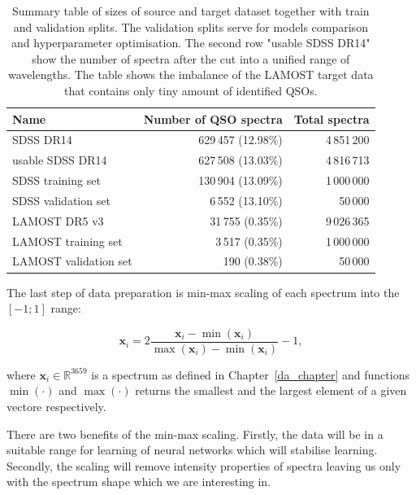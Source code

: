 \begin{table}
\begin{center}
\begin{tabular}{|l|r|r|}
	\hline
	Name & Number of QSO spectra & Total spectra \\ \hline \hline
	SDSS DR14 & 629\,457 (12.98\%) & 4\,851\,200 \\ \hline
	usable SDSS DR14 & 627\,508 (13.03\%) & 4\,816\,713 \\ \hline
	SDSS training set & 130\,904 (13.09\%) & 1\,000\,000 \\ \hline
	SDSS validation set & 6\,552 (13.10\%) & 50\,000 \\ \hline
	LAMOST DR5 v3 & 31\,755 (0.35\%) & 9\,026\,365 \\ \hline
	LAMOST training set & 3\,517 (0.35\%) & 1\,000\,000 \\ \hline
	LAMOST validation set & 190 (0.38\%) & 50\,000 \\ \hline
\end{tabular}
\end{center}
\caption[Sizes of source and target datasets]{
	Summary table of sizes of source and target dataset
	together with train and validation splits.
	The validation splits serve for models comparison
	and hyperparameter optimisation.
	The second row "usable SDSS DR14" show the number of spectra
	after the cut into a unified range of wavelengths.
	The table shows the imbalance of the LAMOST target data
	that contains only tiny amount of identified QSOs.
	}
\label{datasets_sizes}
\end{table}

The last step of data preparation is min-max scaling of each spectrum into the \([-1; 1]\) range:

\begin{equation}
	\mathbf{x}_i = 2 \frac{\mathbf{x}_i - \min(\mathbf{x}_i)}{
		\max(\mathbf{x}_i) - \min(\mathbf{x}_i)} - 1,
\end{equation}

where \(\mathbf{x}_i \in \mathbb{R}^{3659}\) is a spectrum as defined in Chapter~\ref{da_chapter}
and functions \(\min(\cdot)\) and \(\max(\cdot)\) returns the smallest and the largest element of a given vectore respectively.

There are two benefits of the min-max scaling.
Firstly, the data will be in a suitable range for learning of neural networks
which will stabilise learning.
Secondly, the scaling will remove intensity properties of spectra
leaving us only with the spectrum shape which we are interesting in.

